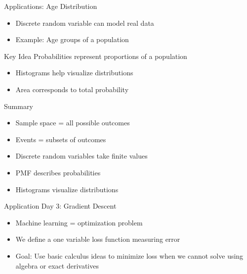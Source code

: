 \documentclass[dvipsnames]{beamer}
\begin{document}

\begin{frame}{Applications: Age Distribution}
\begin{itemize}
    \item Discrete random variable can model real data
    \item Example: Age groups of a population
\end{itemize}


\begin{block}{Key Idea}
Probabilities represent proportions of a population
\end{block}

\begin{itemize}
    \item Histograms help visualize distributions
    \item Area corresponds to total probability
\end{itemize}
\end{frame}


\begin{frame}{Summary}
\begin{itemize}
    \item Sample space = all possible outcomes
    \item Events = subsets of outcomes
    \item Discrete random variables take finite values
    \item PMF describes probabilities
    \item Histograms visualize distributions
\end{itemize}
\end{frame}








\begin{frame}{Application Day 3: Gradient Descent}
\begin{itemize}
    \item Machine learning = optimization problem
    \item We define a one variable loss function measuring error
    \item Goal: Use basic calculus ideas to minimize loss when we cannot solve using algebra or exact derivatives
\end{itemize}
\end{frame}
\end{document}
